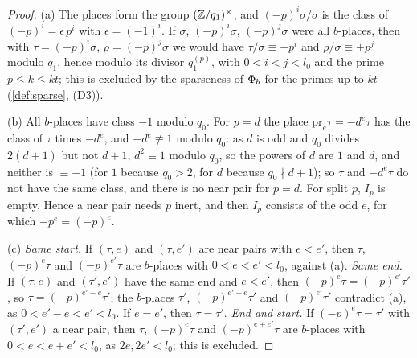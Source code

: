 \begin{proof}
(a) The places form the group $(\mathbb{Z}/q_1)^\times$, and $(-p)^i\sigma/\sigma$ is the class of $(-p)^i=\epsilon\,p^i$ with $\epsilon=(-1)^i$. If $\sigma$, $(-p)^i\sigma$, $(-p)^j\sigma$ were all $b$-places, then with $\tau=(-p)^i\sigma$, $\rho=(-p)^j\sigma$ we would have $\tau/\sigma\equiv\pm p^i$ and $\rho/\sigma\equiv\pm p^j$ modulo $q_1$, hence modulo its divisor $q_1^{(p)}$, with $0<i<j<l_0$ and the prime $p\le k\le kt$; this is excluded by the sparseness of $\Phi_b$ for the primes up to $kt$ (\cref{def:sparse}, (D3)).

(b) All $b$-places have class $-1$ modulo $q_0$. For $p=d$ the place $\mathrm{pr}_e\tau=-d^e\tau$ has the class of $\tau$ times $-d^e$, and $-d^e\not\equiv1$ modulo $q_0$: as $d$ is odd and $q_0$ divides $2(d+1)$ but not $d+1$, $d^2\equiv1$ modulo $q_0$, so the powers of $d$ are $1$ and $d$, and neither is $\equiv-1$ (for $1$ because $q_0>2$, for $d$ because $q_0\nmid d+1$); so $\tau$ and $-d^e\tau$ do not have the same class, and there is no near pair for $p=d$. For split $p$, $I_p$ is empty. Hence a near pair needs $p$ inert, and then $I_p$ consists of the odd $e$, for which $-p^e=(-p)^e$.

(c) \emph{Same start.} If $(\tau,e)$ and $(\tau,e')$ are near pairs with $e<e'$, then $\tau$, $(-p)^e\tau$ and $(-p)^{e'}\tau$ are $b$-places with $0<e<e'<l_0$, against (a). \emph{Same end.} If $(\tau,e)$ and $(\tau',e')$ have the same end and $e<e'$, then $(-p)^e\tau=(-p)^{e'}\tau'$, so $\tau=(-p)^{e'-e}\tau'$; the $b$-places $\tau'$, $(-p)^{e'-e}\tau'$ and $(-p)^{e'}\tau'$ contradict (a), as $0<e'-e<e'<l_0$. If $e=e'$, then $\tau=\tau'$. \emph{End and start.} If $(-p)^e\tau=\tau'$ with $(\tau',e')$ a near pair, then $\tau$, $(-p)^e\tau$ and $(-p)^{e+e'}\tau$ are $b$-places with $0<e<e+e'<l_0$, as $2e,2e'<l_0$; this is excluded.
\end{proof}

